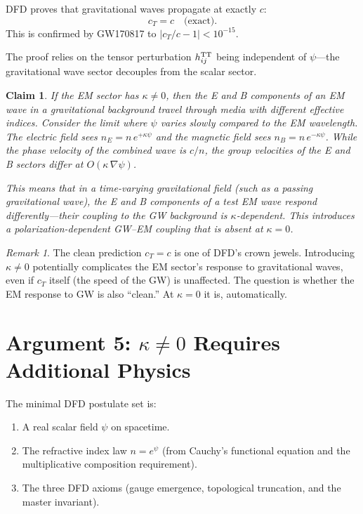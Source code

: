 \documentclass[12pt,a4paper]{article}
\newtheorem{claim}{Claim}
\theoremstyle{definition}
\theoremstyle{remark}
\newtheorem{remark}{Remark}
\begin{document}
DFD proves that gravitational waves propagate at exactly $c$:
\begin{equation}
c_T = c \quad \text{(exact)}.
\end{equation}
This is confirmed by GW170817 to $|c_T/c - 1| < 10^{-15}$.

The proof relies on the tensor perturbation $h_{ij}^{\rm TT}$ being
independent of $\psi$---the gravitational wave sector decouples from the
scalar sector.

\begin{claim}
If the EM sector has $\kappa \neq 0$, then the E and B components of
an EM wave in a gravitational background travel through media with
different effective indices.  Consider the limit where $\psi$ varies
slowly compared to the EM wavelength.  The electric field sees
$n_E = n\, e^{+\kappa\psi}$ and the magnetic field sees
$n_B = n\, e^{-\kappa\psi}$.  While the phase velocity of the combined
wave is $c/n$, the \emph{group velocities} of the E and B sectors
differ at $O(\kappa\, \nabla\psi)$.

This means that in a time-varying gravitational field (such as a passing
gravitational wave), the E and B components of a test EM wave respond
differently---their coupling to the GW background is
$\kappa$-dependent.  This introduces a polarization-dependent GW--EM
coupling that is \emph{absent} at $\kappa = 0$.
\end{claim}

\begin{remark}
The clean prediction $c_T = c$ is one of DFD's crown jewels.  Introducing
$\kappa \neq 0$ potentially complicates the EM sector's response to
gravitational waves, even if $c_T$ itself (the speed of the GW) is
unaffected.  The question is whether the EM response to GW is also
``clean.''  At $\kappa = 0$ it is, automatically.
\end{remark}

\section{Argument 5: $\kappa \neq 0$ Requires Additional Physics}
\label{sec:additional-physics}

The minimal DFD postulate set is:
\begin{enumerate}
\item A real scalar field $\psi$ on spacetime.
\item The refractive index law $n = e^\psi$ (from Cauchy's functional
  equation and the multiplicative composition requirement).
\item The three DFD axioms (gauge emergence, topological truncation,
  and the master invariant).
\end{enumerate}
\end{document}
